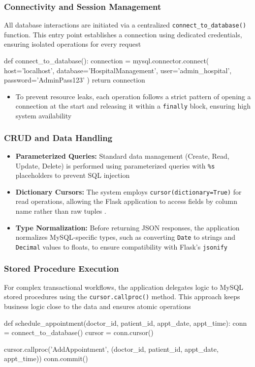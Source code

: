 \subsubsection*{Connectivity and Session Management}
All database interactions are initiated via a centralized \texttt{connect\_to\_database()} function. This entry point establishes a connection using dedicated credentials, ensuring isolated operations for every request
\begin{pythoncode}
def connect_to_database():
    connection = mysql.connector.connect(
        host='localhost',
        database='HospitalManagement',
        user='admin_hospital',
        password='AdminPass123'
    )
    return connection
\end{pythoncode}

\begin{itemize}
    \item To prevent resource leaks, each operation follows a strict pattern of opening a connection at the start and releasing it within a \texttt{finally} block, ensuring high system availability
\end{itemize}

\subsubsection*{CRUD and Data Handling}
\begin{itemize}
    \item \textbf{Parameterized Queries:} Standard data management (Create, Read, Update, Delete) is performed using parameterized queries with \texttt{\%s} placeholders to prevent SQL injection
    \item \textbf{Dictionary Cursors:} The system employs \texttt{cursor(dictionary=True)} for read operations, allowing the Flask application to access fields by column name rather than raw tuples \cite{mysql_connector_connecting}.
    \item \textbf{Type Normalization:} Before returning JSON responses, the application normalizes MySQL-specific types, such as converting \texttt{Date} to strings and \texttt{Decimal} values to floats, to ensure compatibility with Flask's \texttt{jsonify}
\end{itemize}

\subsubsection*{Stored Procedure Execution}
For complex transactional workflows, the application delegates logic to MySQL stored procedures using the \texttt{cursor.callproc()} method. This approach keeps business logic close to the data and ensures atomic operations
\begin{pythoncode}
def schedule_appointment(doctor_id, patient_id, appt_date, appt_time):
    conn = connect_to_database()
    cursor = conn.cursor()
    
    cursor.callproc('AddAppointment', (doctor_id, patient_id, appt_date, appt_time))
    conn.commit()
\end{pythoncode}

